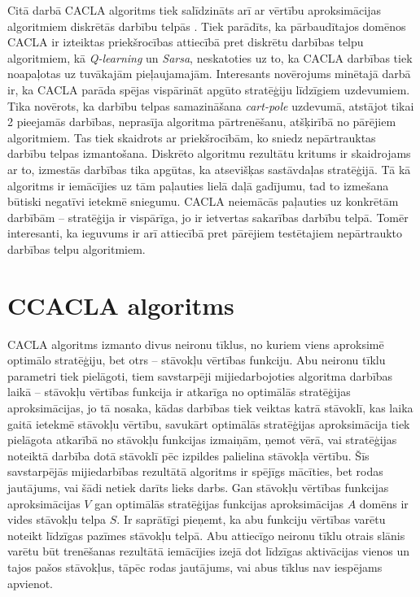 \documentclass{ludis} %
\begin{document}
Citā darbā CACLA algoritms tiek salīdzināts arī ar vērtību aproksimācijas
algoritmiem diskrētās darbību telpās \autocite{Hasselt2009}. Tiek parādīts, ka
pārbaudītajos domēnos CACLA ir izteiktas priekšrocības attiecībā pret diskrētu
darbības telpu algoritmiem, kā \textit{Q-learning} un \textit{Sarsa},
neskatoties uz to, ka CACLA darbības tiek noapaļotas uz tuvākajām pieļaujamajām.
Interesants novērojums minētajā darbā ir, ka CACLA parāda spējas vispārināt
apgūto stratēģiju līdzīgiem uzdevumiem. Tika novērots, ka darbību telpas
samazināšana \textit{cart-pole} uzdevumā, atstājot tikai 2 pieejamās darbības,
neprasīja algoritma pārtrenēšanu, atšķirībā no pārējiem algoritmiem. Tas tiek
skaidrots ar priekšrocībām, ko sniedz nepārtrauktas darbību telpas izmantošana.
Diskrēto algoritmu rezultātu kritums ir skaidrojams ar to, izmestās darbības
tika apgūtas, ka atsevišķas sastāvdaļas stratēģijā. Tā kā algoritms ir
iemācījies uz tām paļauties lielā daļā gadījumu, tad to izmešana būtiski
negatīvi ietekmē sniegumu. CACLA neiemācās paļauties uz konkrētām darbībām --
stratēģija ir vispārīga, jo ir ietvertas sakarības darbību telpā. Tomēr
interesanti, ka ieguvums ir arī attiecībā pret pārējiem testētajiem nepārtraukto
darbības telpu algoritmiem.

\section{CCACLA algoritms}\label{sec:ccacla}
CACLA algoritms izmanto divus neironu tīklus, no kuriem viens aproksimē optimālo
stratēģiju, bet otrs -- stāvokļu vērtības funkciju. Abu neironu tīklu parametri
tiek pielāgoti, tiem savstarpēji mijiedarbojoties algoritma darbības laikā --
stāvokļu vērtības funkcija ir atkarīga no optimālās stratēģijas aproksimācijas,
jo tā nosaka, kādas darbības tiek veiktas katrā stāvoklī, kas laika gaitā
ietekmē stāvokļu vērtību, savukārt optimālās stratēģijas aproksimācija tiek
pielāgota atkarībā no stāvokļu funkcijas izmaiņām, ņemot vērā, vai stratēģijas
noteiktā darbība dotā stāvoklī pēc izpildes palielina stāvokļa vērtību. Šīs
savstarpējās mijiedarbības rezultātā algoritms ir spējīgs mācīties, bet rodas
jautājums, vai šādi netiek darīts lieks darbs. Gan stāvokļu vērtības funkcijas
aproksimācijas $V$ gan optimālās stratēģijas funkcijas aproksimācijas $A$ domēns
ir vides stāvokļu telpa $S$. Ir saprātīgi pieņemt, ka abu funkciju vērtības
varētu noteikt līdzīgas pazīmes stāvokļu telpā. Abu attiecīgo neironu tīklu
otrais slānis varētu būt trenēšanas rezultātā iemācījies izejā dot līdzīgas
aktivācijas vienos un tajos pašos stāvokļus, tāpēc rodas jautājums, vai abus
tīklus nav iespējams apvienot.
\end{document}
